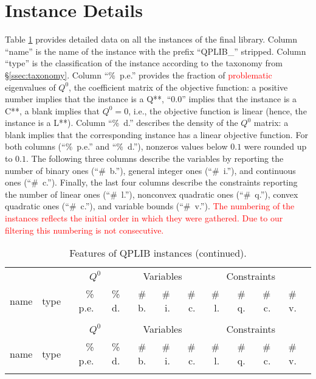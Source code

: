 
\section{Instance Details}\label{sec:instance_details}


Table \ref{tab:A1} provides detailed data on all the instances of the final library.
Column ``name'' is the name of the instance with the prefix ``QPLIB\_'' stripped.
Column ``type'' is the classification of the instance according to the taxonomy from \S\ref{ssec:taxonomy}.
Column ``\%~p.e.'' provides the fraction of \textcolor{red}{problematic} eigenvalues of $Q^0$, the coefficient matrix of the objective function: a positive number implies that the instance is a Q**, ``0.0'' implies that the instance is a C**, a blank implies that $Q^0 = 0$, i.e., the objective function is linear (hence, the instance is a L**).
Column ``\%~d.'' describes the density of the $Q^0$ matrix: a blank implies that the corresponding instance has a linear objective function.
For both columns (``\%~p.e.'' and ``\%~d.''), nonzeros values below $0.1$ were rounded up to $0.1$.
The following three columns describe the variables by reporting the number of binary ones (``\#~b.''), general integer ones (``\#~i.''), and continuous ones (``\#~c.''). Finally, the last four columns describe the constraints reporting the number of linear ones (``\#~l.''), nonconvex quadratic ones (``\#~q.''), convex quadratic ones (``\#~c.''), and variable bounds (``\#~v.'').
\textcolor{red}{The numbering of the instances reflects the initial order in which they were gathered. Due to our filtering this numbering is not consecutive.}


{\tiny
\begin{longtable}[c]{llrrrrrrrrrr}
\caption{Features of QPLIB instances.} \\
\toprule
& & \multicolumn{2}{c}{$Q^0$} & \multicolumn{3}{c}{Variables} & \multicolumn{4}{c}{Constraints} \\
\cmidrule(lr){3-4} \cmidrule(lr){5-7} \cmidrule(lr){8-11}
name & type & \% p.e. & \% d. & \# b. & \# i. & \# c. & \# l. & \# q. & \# c. & \# v. \\
\midrule
\endfirsthead

\caption{Features of QPLIB instances (continued).} \\
\toprule
& & \multicolumn{2}{c}{$Q^0$} & \multicolumn{3}{c}{Variables} & \multicolumn{4}{c}{Constraints} \\
\cmidrule(lr){3-4} \cmidrule(lr){5-7} \cmidrule(lr){8-11}
name & type & \% p.e. & \% d. & \# b. & \# i. & \# c. & \# l. & \# q. & \# c. & \# v. \\
\midrule
\endhead



\bottomrule
\label{tab:A1}
\end{longtable}
}





